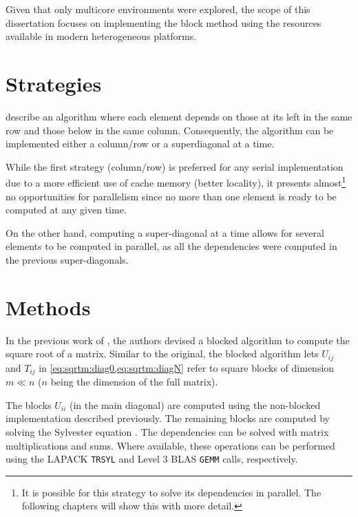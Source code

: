 \documentclass[../thesis]{subfiles}
\begin{document}
  Given that only multicore environments were explored, the scope of this dissertation focuses on implementing the block method using  the resources available in modern heterogeneous platforms.

	\section{Strategies}
		 describe an algorithm where each element depends on those at its left in the same row and those below in the same column. Consequently, the algorithm can be implemented either a column/row or a superdiagonal at a time.

		While the first strategy (column/row) is preferred for any serial implementation due to a more efficient use of cache memory (better locality), it presents almost\footnote{It is possible for this strategy to solve its dependencies in parallel. The following chapters will show this with more detail.} no opportunities for parallelism since no more than one element is ready to be computed at any given time.

		On the other hand, computing a super-diagonal at a time allows for several elements to be computed in parallel, as all the dependencies were computed in the previous super-diagonals.

	\section{Methods}
		In the previous work of \citeauthor{Deadman:Higham:Ralha:2013}\xspace\cite{Deadman:Higham:Ralha:2013}, the authors devised a blocked algorithm to compute the square root of a matrix. Similar to the original, the blocked algorithm lets $U_{ij}$ and $T_{ij}$ in \cref{eq:sqrtm:diag0,eq:sqrtm:diagN} refer to square blocks of dimension $m \ll n$ ($n$ being the dimension of the full matrix).

		The blocks $U_{ii}$ (in the main diagonal) are computed using the non-blocked implementation described previously.
		The remaining blocks are computed by solving the Sylvester equation .
		The dependencies can be solved with matrix multiplications and sums.
		Where available, these operations can be performed using the LAPACK \texttt{TRSYL} and Level 3 BLAS \texttt{GEMM} calls, respectively.
\end{document}
